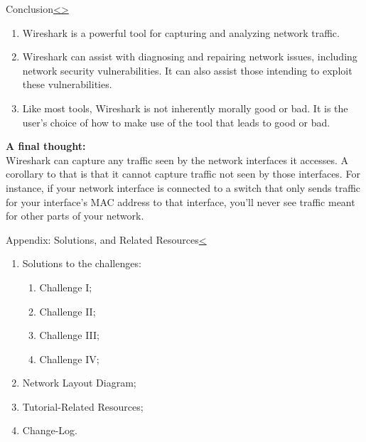 \documentclass[12pt]{extarticle}
\newenvironment{instructionblock}{\Large\bgroup}{\egroup}
\newcommand{\ben}{\begin{enumerate}}
\newcommand{\een}{\end{enumerate}}
\begin{document}
	
	\pagebreak
	\begin{slide}{Conclusion}{\hyperref[slide 34]{\textless}\hyperref[slide 36]{\textgreater}}
		\begin{instructionblock}
			\begin{enumerate}
				\item Wireshark is a powerful tool for capturing and analyzing network traffic.
				\item Wireshark can assist with diagnosing and repairing network issues, including network security vulnerabilities. It can also assist those intending to exploit these vulnerabilities.
				\item Like most tools, Wireshark is not inherently morally good or bad.  It is the user's choice of how to make use of the tool that leads to good or bad.
			\end{enumerate}
		\end{instructionblock}
	\end{slide}
	\vspace{4mm}
	\noindent
	\textbf{A final thought:}\\ 
	Wireshark can capture any traffic seen by the network interfaces it accesses. A corollary to that is that it cannot capture traffic not seen by those interfaces. For instance, if your network interface is connected to a switch that only sends traffic for your interface's MAC address to that interface, you'll never see traffic meant for other parts of your network.
	
	
	
	
	\pagebreak	
	\begin{slide}{Appendix: Solutions, and Related Resources}{\hyperref[slide 35]{\textless}}
		\begin{instructionblock}
			\begin{enumerate}
				\item {Solutions to the challenges:}
				\ben
					\item Challenge I;
					\item Challenge II;
					\item Challenge III;
					\item Challenge IV;
				\een
					\item {Network Layout Diagram;}
					\item {Tutorial-Related Resources;}
					\item {Change-Log.}
			\end{enumerate}
		\end{instructionblock}
	\end{slide}
	
\end{document}
